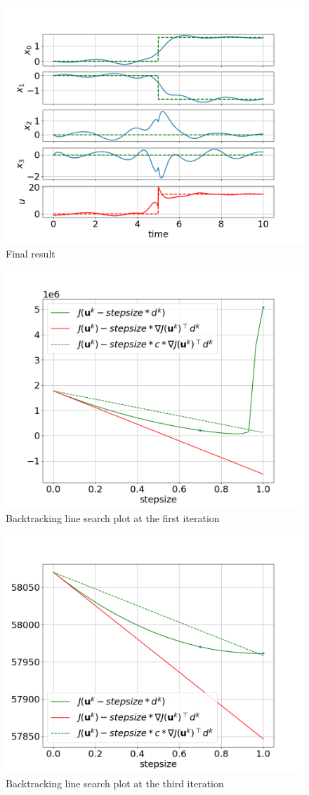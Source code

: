 \begin{figure}
    \centering
    \includegraphics[width=0.8\linewidth]{figs/downwards_f.png}
    \caption{Final result}
    \label{fig:downward_f}
\end{figure}

\begin{figure}
    \centering
    \includegraphics[width=0.8\linewidth]{figs/downward_armijio_0.png}
    \caption{Backtracking line search plot at the first iteration}
    \label{fig:downward_armijio_0}
\end{figure}

\begin{figure}
    \centering
    \includegraphics[width=0.8\linewidth]{figs/downward_armijio_3.png}
    \caption{Backtracking line search plot at the third iteration}
    \label{fig:downward_armijio_3}
\end{figure}

